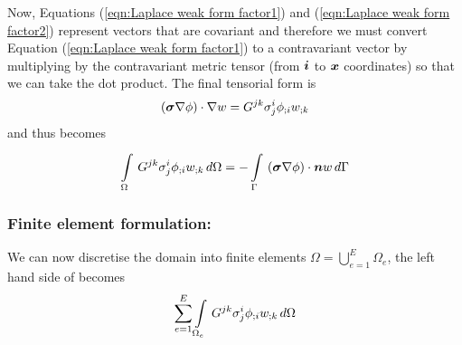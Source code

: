 Now, Equations (\ref{eqn:Laplace weak form factor1}) and (\ref{eqn:Laplace weak form factor2})
represent vectors that are covariant and
therefore we must convert Equation (\ref{eqn:Laplace weak form factor1})
to a contravariant vector by 
multiplying by the contravariant metric tensor (from $\vect{i}$ to $\vect{x}$ 
coordinates) so that we can take the dot product. The final tensorial form is
\begin{equation}
  \left( \boldsymbol{\sigma}\nabla \phi \right)\cdot\nabla w = G^{jk}\sigma^{i}_{j} {\phi}_{;i}  {w}_{;k} 
\end{equation}
and thus  becomes
\begin{equation}
  \gint{\Omega}{}{G^{jk}\sigma^{i}_{j}\covarderiv{\phi}{i}\covarderiv{w}{k}}{\Omega}
  = -\gint{\Gamma}{}{\dotprod{\pbrac{\tensor{\sigma}\gradient{\phi}}}{\vect{n}w}}{\Gamma}
  \label{eqn:Laplaceweightedresidualtensorform}
\end{equation}

\subsubsection{Finite element formulation:}
We can now discretise the domain into finite elements \ie $\Omega=
\displaystyle{\bigcup_{e=1}^{E}}\Omega_{e}$, the left hand side of
 becomes
\begin{equation}
  \displaystyle\sum_{e=1}^{E}  \displaystyle\int\limits_{\Omega_{e}}^{} \,G^{jk}\sigma^{i}_{j} {\phi}_{;i}  {w}_{;k} \,d\Omega 
\end{equation}

